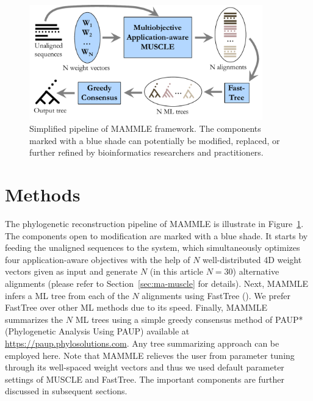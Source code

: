 \begin{figure}[!htbp]
	\centering
	\includegraphics[width=0.9\textwidth]{Figure/workflow.pdf}
	\caption{Simplified pipeline of MAMMLE framework. The components marked with a blue shade can potentially be modified, replaced, or further refined by bioinformatics researchers and practitioners.}
	\label{fig:workflow}
\end{figure}

\section{Methods}
The phylogenetic reconstruction pipeline of MAMMLE is illustrate in Figure~\ref{fig:workflow}. The components open to modification are marked with a blue shade. It starts by feeding the unaligned sequences to the system, which simultaneously optimizes four application-aware objectives with the help of $N$ well-distributed 4D weight vectors given as input and generate $N$ (in this article $N=30$) alternative alignments (please refer to Section~\ref{sec:ma-muscle} for details). %
Next, MAMMLE infers a ML tree from each of the $N$ alignments using FastTree (\cite{price2010fasttree}). We prefer FastTree over other ML methods due to its speed. Finally, MAMMLE summarizes the $N$ ML trees using a simple greedy consensus method of PAUP* (Phylogenetic Analysis Using PAUP) available at \url{https://paup.phylosolutions.com}. Any tree summarizing approach can be employed here. Note that MAMMLE relieves the user from parameter tuning through its well-spaced weight vectors and thus we used default parameter settings of MUSCLE and FastTree. The important components are further discussed in subsequent sections.

